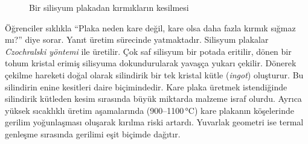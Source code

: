 \begin{figure}[H]
\caption{Bir silisyum plakadan kırmıkların kesilmesi}
\label{fig:silisyum-plaka}
\end{figure}

\begin{bilginot}
Öğrenciler sıklıkla ``Plaka neden kare değil, kare olsa daha fazla kırmık sığmaz mı?'' diye sorar. Yanıt üretim sürecinde yatmaktadır. Silisyum plakalar \emph{Czochralski yöntemi} ile üretilir. Çok saf silisyum bir potada eritilir, dönen bir tohum kristal erimiş silisyuma dokundurularak yavaşça yukarı çekilir. Dönerek çekilme hareketi doğal olarak silindirik bir tek kristal kütle (\emph{ingot}) oluşturur. Bu silindirin enine kesitleri daire biçimindedir. Kare plaka üretmek istendiğinde silindirik kütleden kesim sırasında büyük miktarda malzeme israf olurdu. Ayrıca yüksek sıcaklıklı üretim aşamalarında (900--1100\,°C) kare plakanın köşelerinde gerilim yoğunlaşması oluşarak kırılma riski artardı. Yuvarlak geometri ise termal genleşme sırasında gerilimi eşit biçimde dağıtır.
\end{bilginot}


